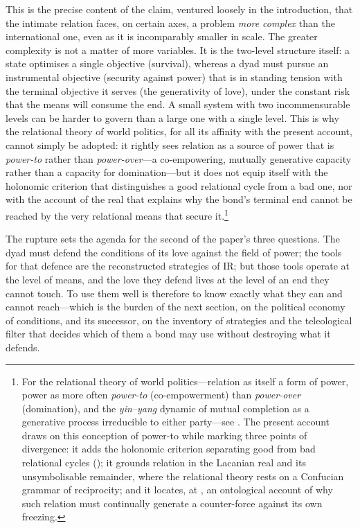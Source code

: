 \noindent
This is the precise content of the claim, ventured loosely in the introduction, that the intimate relation faces, on certain axes, a problem \emph{more complex} than the international one, even as it is incomparably smaller in scale. The greater complexity is not a matter of more variables. It is the two-level structure itself: a state optimises a single objective (survival), whereas a dyad must pursue an instrumental objective (security against power) that is in standing tension with the terminal objective it serves (the generativity of love), under the constant risk that the means will consume the end. A small system with two incommensurable levels can be harder to govern than a large one with a single level. This is why the relational theory of world politics, for all its affinity with the present account, cannot simply be adopted: it rightly sees relation as a source of power that is \emph{power-to} rather than \emph{power-over}---a co-empowering, mutually generative capacity rather than a capacity for domination---but it does not equip itself with the holonomic criterion that distinguishes a good relational cycle from a bad one, nor with the account of the real that explains why the bond's terminal end cannot be reached by the very relational means that secure it.\footnote{For the relational theory of world politics---relation as itself a form of power, power as more often \emph{power-to} (co-empowerment) than \emph{power-over} (domination), and the \emph{yin--yang} dynamic of mutual completion as a generative process irreducible to either party---see \textcite{qin2018}. The present account draws on this conception of power-to while marking three points of divergence: it adds the holonomic criterion separating good from bad relational cycles (\cite{paperix}); it grounds relation in the Lacanian real and its unsymbolisable remainder, where the relational theory rests on a Confucian grammar of reciprocity; and it locates, at , an ontological account of why such relation must continually generate a counter-force against its own freezing.}

The rupture sets the agenda for the second of the paper's three questions. The dyad must defend the conditions of its love against the field of power; the tools for that defence are the reconstructed strategies of IR; but those tools operate at the level of means, and the love they defend lives at the level of an end they cannot touch. To use them well is therefore to know exactly what they can and cannot reach---which is the burden of the next section, on the political economy of conditions, and its successor, on the inventory of strategies and the teleological filter that decides which of them a bond may use without destroying what it defends.
